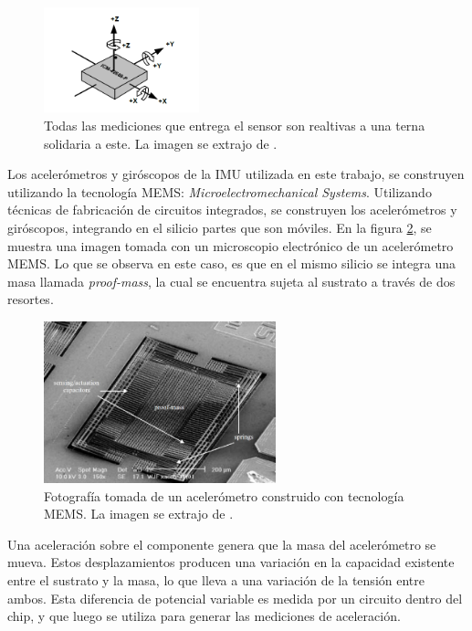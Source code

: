 \begin{figure}[H]
    \centering
    \includegraphics[width=0.4\textwidth]{img/IMU_ejes.png}
    \caption{Todas las mediciones que entrega el sensor son realtivas a una terna solidaria a este. La imagen se extrajo de \cite{ICM42688pDatasheet}.}
    \label{fig:IMU_ejes}
\end{figure}

Los acelerómetros y giróscopos de la IMU utilizada en este trabajo, se construyen utilizando la tecnología MEMS: \textit{Microelectromechanical Systems}. Utilizando técnicas de fabricación de circuitos integrados, se construyen los acelerómetros y giróscopos, integrando en el silicio partes que son móviles. En la figura \ref{fig:MEMS_acelerometro}, se muestra una imagen tomada con un microscopio electrónico de un acelerómetro MEMS. Lo que se observa en este caso, es que en el mismo silicio se integra una masa llamada \textit{proof-mass}, la cual se encuentra sujeta al sustrato a través de dos resortes.

\begin{figure}[H]
    \centering
    \includegraphics[width=0.6\textwidth]{img/MEMS_acelerometro.png}
    \caption{Fotografía tomada de un acelerómetro construido con tecnología MEMS. La imagen se extrajo de \cite{zhang2010sensing}. }
    \label{fig:MEMS_acelerometro}    
\end{figure}

Una aceleración sobre el componente genera que la masa del acelerómetro se mueva. Estos desplazamientos producen una variación en la capacidad existente entre el sustrato y la masa, lo que lleva a una variación de la tensión entre ambos. Esta diferencia de potencial variable es medida por un circuito dentro del chip, y que luego se utiliza para generar las mediciones de aceleración.\\

